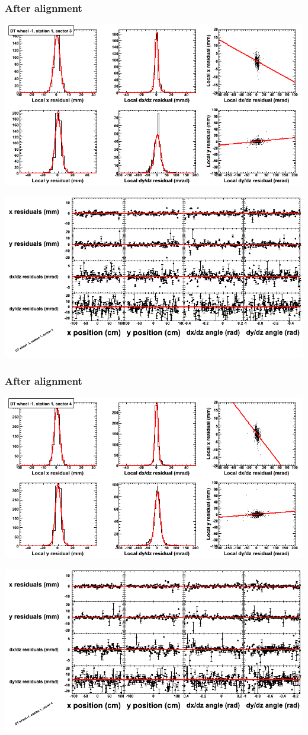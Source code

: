 \documentclass[compress]{beamer}
\begin{document}
\begin{frame}
\frametitle{After alignment}
\includegraphics[width=0.7\linewidth]{NOV4_fitfunctions/MBwhBst1sec03_bellcurves.png}

\includegraphics[width=0.7\linewidth]{NOV4_fitfunctions/MBwhBst1sec03_polynomials.png}
\end{frame}

\begin{frame}
\frametitle{After alignment}
\includegraphics[width=0.7\linewidth]{NOV4_fitfunctions/MBwhBst1sec04_bellcurves.png}

\includegraphics[width=0.7\linewidth]{NOV4_fitfunctions/MBwhBst1sec04_polynomials.png}
\end{frame}
\end{document}

